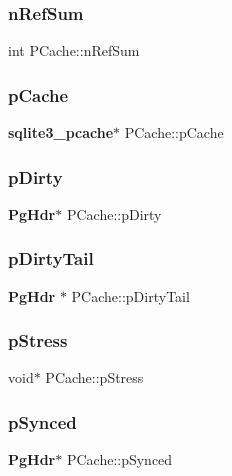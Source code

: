 \mbox{\label{struct_p_cache_a9688476c9cab5a7af8d09860567759eb}} 
\subsubsection{nRefSum}
{\footnotesize\ttfamily int P\+Cache\+::n\+Ref\+Sum}

\mbox{\label{struct_p_cache_ad0248655d30d327e0eeced6c3651b161}} 
\subsubsection{pCache}
{\footnotesize\ttfamily \textbf{ sqlite3\+\_\+pcache}$\ast$ P\+Cache\+::p\+Cache}

\mbox{\label{struct_p_cache_a1c692ce92c7d3fc7c6c1324d5658b252}} 
\subsubsection{pDirty}
{\footnotesize\ttfamily \textbf{ Pg\+Hdr}$\ast$ P\+Cache\+::p\+Dirty}

\mbox{\label{struct_p_cache_a8eaca309bfb8fa49e7c5e77dd3398bb0}} 
\subsubsection{pDirtyTail}
{\footnotesize\ttfamily \textbf{ Pg\+Hdr} $\ast$ P\+Cache\+::p\+Dirty\+Tail}

\mbox{\label{struct_p_cache_af04a2ea8a2c6d6b3eea7bb7051b8f447}} 
\subsubsection{pStress}
{\footnotesize\ttfamily void$\ast$ P\+Cache\+::p\+Stress}

\mbox{\label{struct_p_cache_a607eabd6768dd8df47d8fa353542b106}} 
\subsubsection{pSynced}
{\footnotesize\ttfamily \textbf{ Pg\+Hdr}$\ast$ P\+Cache\+::p\+Synced}

